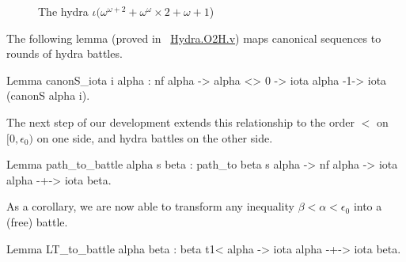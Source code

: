 \documentclass[a4paper]{book}
\begin{document}
  \begin{figure}[htb]
\centering
{}
\caption{The hydra $\iota(\omega^{\omega+2}+\omega^\omega \times 2 + \omega + 1$) \label{fig:iota-example}}

\end{figure}


The following lemma (proved in ~\href{../src/html/hydras.Hydra.O2H.html}{Hydra.O2H.v}) maps  canonical sequences to rounds of hydra battles.


\label{lemma:canonS-iota}

\begin{Coqsrc}
Lemma canonS_iota i alpha :
    nf alpha -> alpha <> 0 ->
    iota alpha -1-> iota (canonS alpha i).
\end{Coqsrc}
                

The next step of our development extends this relationship to
the order $<$ on $[0,\epsilon_0)$ on one side, and hydra battles on the other side.


\begin{Coqsrc}
Lemma path_to_battle alpha s beta :
  path_to  beta  s alpha -> nf alpha ->
  iota alpha -+-> iota beta.
\end{Coqsrc}

As a corollary, we are now able to transform any inequality $\beta<\alpha<\epsilon_0$ into a (free) battle.

\begin{Coqsrc}
Lemma LT_to_battle alpha beta :
    beta t1< alpha ->  iota alpha -+-> iota beta.
\end{Coqsrc}
\end{document}

